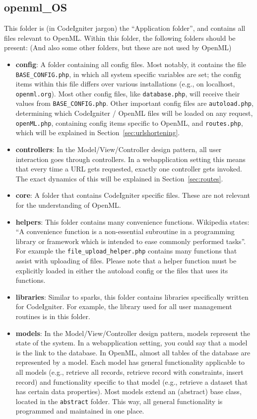 \documentclass[10pt]{article}
\begin{document}
\subsection{openml\_OS}
\label{sec:openmlos}
This folder is (in CodeIgniter jargon) the ``Application folder'', and contains all files relevant to OpenML. Within this folder, the following folders should be present: (And also some other folders, but these are not used by OpenML)
\begin{itemize}
\item \textbf{config}: A folder containing all config files. Most notably, it contains the file {\tt BASE\_CONFIG.php}, in which all system specific variables are set; the config items within this file differs over various installations (e.g., on localhost, \texttt{openml.org}). Most other config files, like {\tt database.php}, will receive their values from {\tt BASE\_CONFIG.php}. Other important config files are {\tt autoload.php}, determining which CodeIgniter / OpenML files will be loaded on any request, {\tt openML.php}, containing config items specific to OpenML, and {\tt routes.php}, which will be explained in Section~\ref{sec:urlshortening}.
\item \textbf{controllers}: In the Model/View/Controller design pattern, all user interaction goes through controllers. In a webapplication setting this means that every time a URL gets requested, exactly one controller gets invoked. The exact dynamics of this will be explained in Section~\ref{sec:routes}. 
\item \textbf{core}: A folder that contains CodeIgniter specific files. These are not relevant for the understanding of OpenML. 
\item \textbf{helpers}: This folder contains many convenience functions. Wikipedia states: ``A convenience function is a non-essential subroutine in a programming library or framework which is intended to ease commonly performed tasks''. For example the {\tt file\_upload\_helper.php} contains many functions that assist with uploading of files. Please note that a helper function must be explicitly loaded in either the autoload config or the files that uses its functions. 
\item \textbf{libraries}: Similar to sparks, this folder contains libraries specifically written for CodeIgniter. For example, the library used for all user management routines is in this folder.
\item \textbf{models}: In the Model/View/Controller design pattern, models represent the state of the system. In a webapplication setting, you could say that a model is the link to the database. In OpenML, almost all tables of the database are represented by a model. Each model has general functionality applicable to all models (e.g., retrieve all records, retrieve record with constraints, insert record) and functionality specific to that model (e.g., retrieve a dataset that has certain data properties). Most models extend an (abstract) base class, located in the {\tt abstract} folder. This way, all general functionality is programmed and maintained in one place. 

\end{itemize}
\end{document}
